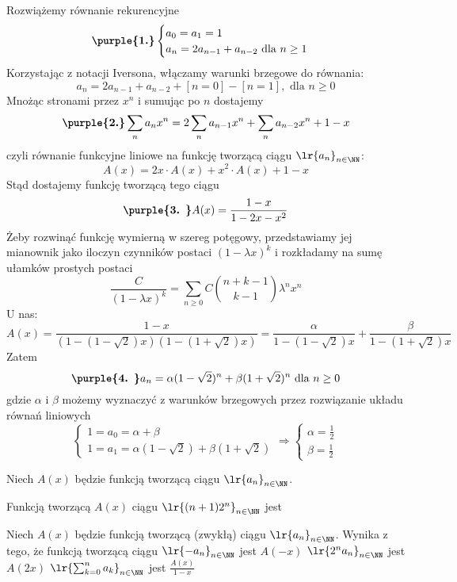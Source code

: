 \begin{example}
    Rozwiążemy równanie rekurencyjne\\
    $$
    \textbf{\purple{1.}}\begin{cases}
        a_0 = a_1 = 1 \\
        a_n = 2a_{n-1} + a_{n-2} \text{ dla } n\geq1
    \end{cases}
    $$
    Korzystając z notacji Iversona, włączamy warunki brzegowe do równania:\\
    $$a_n=2a_{n-1}+a_{n-2}+[n=0]-[n=1], \text{ dla } n\geq0$$
    Mnożąc stronami przez $x^n$ i sumując po $n$ dostajemy
    $$\textbf{\purple{2.}}\sum_n a_nx^n = 2\sum_n a_{n-1}x^n + \sum_n a_{n-2}x^n + 1 - x$$
    czyli równanie funkcyjne liniowe na funkcję tworzącą ciągu $\lr{a_n}_{n\in\NN}$:
    $$A(x) = 2x\cdot A(x) + x^2\cdot A(x) + 1 - x$$
    Stąd dostajemy funkcję tworzącą tego ciągu
    $$\textbf{\purple{3. }}A(x) = \frac{1-x}{1-2x-x^2}$$
    Żeby rozwinąć funkcję wymierną w szereg potęgowy, przedstawiamy jej mianownik jako iloczyn czynników postaci $(1-\lambda x)^k$ i rozkładamy na sumę ułamków prostych postaci
    $$\frac{C}{(1-\lambda x)^k} = \sum_{n\geq0}C\binom{n+k-1}{k-1}\lambda^nx^n$$
    U nas:
    $$A(x) = \frac{1-x}{(1-(1-\sqrt{2})x)(1-(1+\sqrt{2})x)} = \frac{\alpha}{1-(1-\sqrt{2})x} + \frac{\beta}{1-(1+\sqrt{2})x}$$
    Zatem
    $$\textbf{\purple{4. }}a_n = \alpha(1-\sqrt{2})^n + \beta(1+\sqrt{2})^n \text{ dla } n\geq0$$
    gdzie $\alpha$ i $\beta$ możemy wyznaczyć z warunków brzegowych przez rozwiązanie układu równań liniowych
    $$
    \begin{cases}
        1 = a_0 = \alpha + \beta \\
        1 = a_1 = \alpha(1-\sqrt{2}) + \beta(1+\sqrt{2})
    \end{cases} \Rightarrow \begin{cases}
        \alpha = \frac{1}{2} \\
        \beta = \frac{1}{2}
    \end{cases}
    $$
\end{example}

\begin{problems}
    \prob Niech $A(x)$ będzie funkcją tworzącą ciągu $\lr{a_n}_{n \in \NN}$.

    \prob Funkcją tworzącą $A(x)$ ciągu $\lr{(n+1)2^n}_{n \in \NN}$ jest

    \prob Niech $A(x)$ będzie funkcją tworzącą (zwykłą) ciągu $\lr{a_n}_{n \in \NN}$. Wynika z tego, że funkcją tworzącą ciągu
    \answers
    {$\lr{-a_n}_{n \in \NN}$ jest $A(-x)$}
    {$\lr{2^n a_n}_{n \in \NN}$ jest $A(2x)$}
    {$\lr{\sum_{k=0}^n a_k}_{n \in \NN}$ jest $\frac{A(x)}{1-x}$}
\end{problems}

